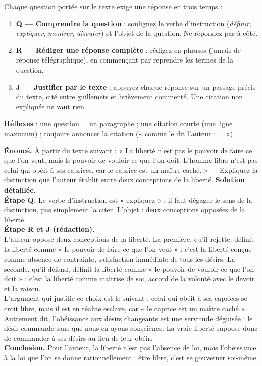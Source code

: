 \documentclass[11pt]{article}
\newcommand{\cle}[1]{{\popxbold\color{popdark}#1}}
\begin{document}
\begin{methode}
Chaque question portée sur le texte exige une réponse en trois temps :
\begin{enumerate}
\item \textbf{Q — Comprendre la question} : soulignez le verbe d'instruction (\emph{définir}, \emph{expliquer}, \emph{montrer}, \emph{discuter}) et l'objet de la question. Ne répondez pas à côté.
\item \textbf{R — Rédiger une réponse complète} : rédigez en phrases (jamais de réponse télégraphique), en commençant par reprendre les termes de la question.
\item \textbf{J — Justifier par le texte} : appuyez chaque réponse sur un passage précis du texte, cité entre guillemets et brièvement commenté. Une citation non expliquée ne vaut rien.
\end{enumerate}
\textbf{Réflexes} : une question = un paragraphe ; une citation courte (une ligne maximum) ; toujours annoncer la citation (« comme le dit l'auteur : ... »).
\end{methode}

\begin{exoresolu}
\textbf{Énoncé.} À partir du texte suivant : « La liberté n'est pas le pouvoir de faire ce que l'on veut, mais le pouvoir de vouloir ce que l'on doit. L'homme libre n'est pas celui qui obéit à ses caprices, car le caprice est un maître caché. » — Expliquez la distinction que l'auteur établit entre deux conceptions de la liberté.
\tcblower
\textbf{Solution détaillée.}\\
\textbf{Étape Q.} Le verbe d'instruction est « expliquez » : il faut dégager le sens de la distinction, pas simplement la citer. L'objet : deux conceptions opposées de la liberté.\\
\textbf{Étape R et J (rédaction).}\\
L'auteur oppose deux conceptions de la \cle{liberté}. La première, qu'il rejette, définit la liberté comme « le pouvoir de faire ce que l'on veut » : c'est la liberté conçue comme absence de contrainte, satisfaction immédiate de tous les désirs. La seconde, qu'il défend, définit la liberté comme « le pouvoir de vouloir ce que l'on doit » : c'est la liberté comme maîtrise de soi, accord de la volonté avec le devoir et la raison.\\
L'argument qui justifie ce choix est le suivant : celui qui obéit à ses caprices se croit libre, mais il est en réalité esclave, car « le caprice est un maître caché ». Autrement dit, l'obéissance aux désirs changeants est une servitude déguisée : le désir commande sans que nous en ayons conscience. La vraie liberté suppose donc de commander à ses désirs au lieu de leur obéir.\\
\textbf{Conclusion.} Pour l'auteur, la liberté n'est pas l'absence de loi, mais l'obéissance à la loi que l'on se donne rationnellement : être libre, c'est se gouverner soi-même.
\end{exoresolu}
\end{document}
